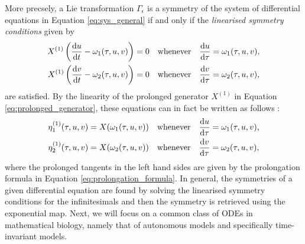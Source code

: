  More precsely, a Lie transformation $\Gamma_\epsilon$ is a symmetry of the system of differential equations in Equation \eqref{eq:sys_general} if and only if the \textit{linearised symmetry conditions} given by
\begin{equation}
  \begin{split}
    X^{(1)}\left(\dv{u}{t}-\omega_1(\tau,u,v)\right)&=0\quad\mathrm{whenever}\quad\dv{u}{\tau}=\omega_1(\tau,u,v),\\
    X^{(1)}\left(\dv{v}{t}-\omega_2(\tau,u,v)\right)&=0\quad\mathrm{whenever}\quad\dv{v}{\tau}=\omega_2(\tau,u,v),
    \end{split}
  \label{eq:lin_sym_ori}
  \end{equation}
are satisfied. By the linearity of the prolonged generator $X^{(1)}$ in Equation \eqref{eq:prolonged_generator}, these equations can in fact be written as follows \cite{stephani1989differential}:
\begin{equation}
  \begin{split}
    \eta_1^{(1)}(\tau,u,v)&=X(\omega_1(\tau,u,v))\quad\mathrm{whenever}\quad\dv{u}{\tau}=\omega_1(\tau,u,v),\\
    \eta_2^{(1)}(\tau,u,v)&=X(\omega_2(\tau,u,v))\quad\mathrm{whenever}\quad\dv{v}{\tau}=\omega_2(\tau,u,v),
    \end{split}
  \label{eq:lin_sym}
\end{equation}
where the prolonged tangents in the left hand sides are given by the prolongation formula in Equation \eqref{eq:prolongation_formula}. In general, the symmetries of a given differential equation are found by solving the linearised symmetry conditions for the infinitesimals and then the symmetry is retrieved using the exponential map. Next, we will focus on a common class of ODEs in mathematical biology, namely that of autonomous models and specifically time-invariant models. 



